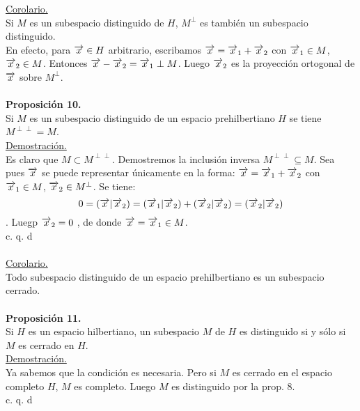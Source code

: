 \underline{Corolario.}\\
Si $M$ es un subespacio distinguido de $H$, $M^\perp$ es también un subespacio distinguido. \\
En efecto, para $\overrightarrow{x} \in H$ arbitrario, escribamos $\overrightarrow{x}=\overrightarrow{x}_1+\overrightarrow{x}_2$ con $\overrightarrow{x}_1 \in M$, $\overrightarrow{x}_2 \in M$. Entonces $\overrightarrow{x}-\overrightarrow{x}_2=\overrightarrow{x}_1 \perp M$. Luego $\overrightarrow{x}_2$ es la proyección ortogonal de $\overrightarrow{x}$ sobre $M^{\perp}$.\\ \\
\textbf{Proposición 10.} \\
Si $M$ es un subespacio distinguido de un espacio prehilbertiano $H$ se tiene $M^{\perp \perp}=M$. \\
\underline{Demostración.}\\
Es claro que $M\subset M^{\perp \perp}$. Demostremos la inclusión inversa $M^{\perp \perp} \subseteq M$. Sea pues $\overrightarrow{x}$ se puede representar únicamente en la forma: $\overrightarrow{x}=\overrightarrow{x}_1+\overrightarrow{x}_2$ con $\overrightarrow{x}_1 \in M$, $\overrightarrow{x}_2 \in M^{\perp}$. Se tiene:\\
$$
0=(\overrightarrow{x} | \overrightarrow{x}_2)=(\overrightarrow{x}_1 | \overrightarrow{x}_2) + (\overrightarrow{x}_2 | \overrightarrow{x}_2)= (\overrightarrow{x}_2 | \overrightarrow{x}_2)$$.
Luegp $\overrightarrow{x}_2=0$ , de donde $\overrightarrow{x}=\overrightarrow{x}_1 \in M$.  \\
\phantom{sssssssssssssssssssssssssssssssssss sasdasdasdasdadadssada} c. q. d \\ \\
\underline{Corolario.} \\
Todo subespacio distinguido de un espacio prehilbertiano es un subespacio cerrado. \\ \\
\textbf{Proposición 11.} \\
Si $H$ es un espacio hilbertiano, un subespacio $M$ de $H$ es distinguido si y sólo si $M$ es cerrado en $H$. \\
\underline{Demostración.} \\
Ya sabemos que la condición es necesaria. Pero si $M$ es cerrado en el espacio completo $H$, $M$ es completo. Luego $M$ es distinguido por la prop. 8. \\
\phantom{sssssssssssssssssssssssssssssssssss sasdasdasdasdadadssada} c. q. d \\ \\

